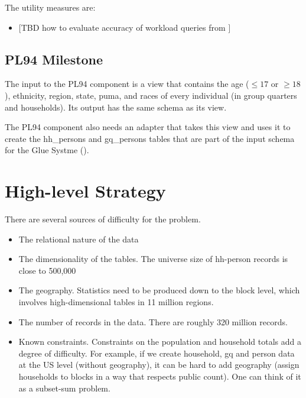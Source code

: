 \documentclass{amsart}
\begin{document}
{The utility measures are:
\begin{itemize}
\item $[$TBD how to evaluate accuracy of workload queries from $]$
\end{itemize}
\subsection{PL94 Milestone}\label{sec:milestone:pl94}
The input to the PL94 component is a view that contains the age ($\leq 17$ or $\geq 18$), ethnicity, region, state, puma, and races of every individual (in group quarters and households). Its output has the same schema as its view.

The PL94 component also needs an adapter that takes this view and uses it to create the hh\_persons and gq\_persons tables that are part of the input schema for the Glue Systme ().



\section{High-level Strategy}
There are several sources of difficulty for the problem. 
\begin{itemize}
\item The relational nature of the data
\item The dimensionality of the tables. The universe size of hh-person records is close to 500,000
\item The geography. Statistics need to be produced down to the block level, which involves high-dimensional tables in 11 million regions.
\item The number of records in the data. There are roughly 320 million records.
\item Known constraints. Constraints on the population and household totals add a degree of difficulty. For example, if we create household, gq and person data at the US level (without geography), it can be hard to add geography (assign households to blocks in a way that respects public count). One can think of it as a subset-sum problem.
\end{itemize}

}
\end{document}
